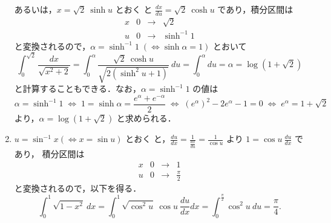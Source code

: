 \documentclass[11pt, uplatex, dvipdfmx]{jsarticle}
\begin{document}
\begin{enumerate}[(1)]
     あるいは，$x = \sqrt{2}~\sinh u$ とおく
     と $\frac{dx}{du} = \sqrt{2}~\cosh u$ であり，積分区間は
     \[
       \begin{array}{c|ccc}
         x & 0 & \to & \sqrt{2}\\ \hline
         u & 0 & \to & \sinh^{-1}1
       \end{array}
     \]
     と変換されるので，$\alpha=\sinh^{-1}1 \; (\Leftrightarrow \sinh \alpha =1)$ とおいて
     \[
       \int_{0}^{\sqrt{2}} \frac{dx}{\sqrt{x^2+2}} =
       \int_{0}^{\alpha}\frac{\sqrt{2}~\cosh
         u}{\sqrt{2\left(\sinh^2u+1\right)}} \ du
       = \int_{0}^{\alpha} du = \alpha= \log\left(1+\sqrt{2}\right)
     \]
     と計算することもできる．なお，$\alpha=\sinh^{-1}1$ の値は
     \[
       \alpha = \sinh^{-1} 1 \; \Leftrightarrow \; 1 = \sinh \alpha = \frac{e^{\alpha}+e^{-\alpha}}{2} \; \Leftrightarrow \;
       \left( e^{\alpha}\right)^2 - 2 e^{\alpha}  -1 =0 \; \Leftrightarrow \; e^{\alpha} = 1+\sqrt{2}
     \]
     より，$\alpha = \log\left( 1+\sqrt{2}\right)$ と求められる．
     
     
   \item $u=\sin^{-1} x \left( \Leftrightarrow x=\sin u\right)$ とおく
     と，$\frac{du}{dx} = \frac{1}{\frac{dx}{du}}=\frac{1}{\cos u}$ より
     $1=\cos u \ \frac{du}{dx}$ であり，
     積分区間は
     \[
       \begin{array}{c|ccc} x & 0 & \to & 1\\ \hline
         u & 0 & \to & \frac{\pi}{2}
       \end{array}
     \]
      と変換されるので，以下を得る．
     \[
       \int_{0}^{1}\sqrt{1-x^2} \ dx = \int_{0}^{1} \sqrt{\cos^2u} \ \cos u \ \frac{du}{dx} dx=
       \int_{0}^{\frac{\pi}{2}} \cos^2 u \ du = \frac{\pi}{4}.
     \]


\end{enumerate}
\end{document}
